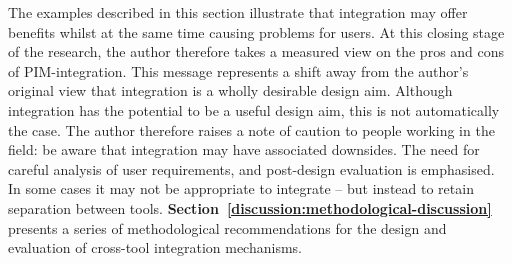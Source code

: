 The examples described in this section illustrate that integration may offer benefits whilst at the same time causing problems for users. 
At this closing stage of the research, the author therefore takes a measured view on the pros and cons of PIM-integration.  This message represents a shift away from the author's original view that integration is a wholly desirable design aim.  Although integration has the potential to be a useful design aim, this is not automatically the case.  The author therefore raises a note of caution to people working in the field: be aware that integration may have associated downsides.   The need for careful analysis of user requirements, and post-design evaluation is emphasised.  In some cases it may not be appropriate to integrate -- but instead to retain separation between tools.   \textbf{Section~\ref{discussion:methodological-discussion}} presents a series of methodological recommendations for the design and evaluation of cross-tool integration mechanisms.  

